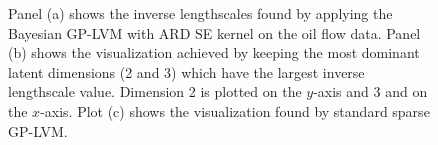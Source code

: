 \documentclass [10pt , a4paper]{article}
\begin{document}
\begin{figure}[ht]
\begin{center}
\end{center}
\caption{\small{
 Panel (a) shows the inverse lengthscales found by applying the
  Bayesian GP-LVM with ARD SE kernel on the oil flow data. Panel (b)
  shows the visualization achieved by keeping the most dominant latent
  dimensions (2 and 3) which have the largest inverse lengthscale
  value. Dimension 2 is plotted on the
  $y$-axis and 3 and on the $x$-axis. Plot (c) shows the visualization found
  by standard sparse GP-LVM.
}
}
\label{fig:oil}
\end{figure}

%
\end{document}
